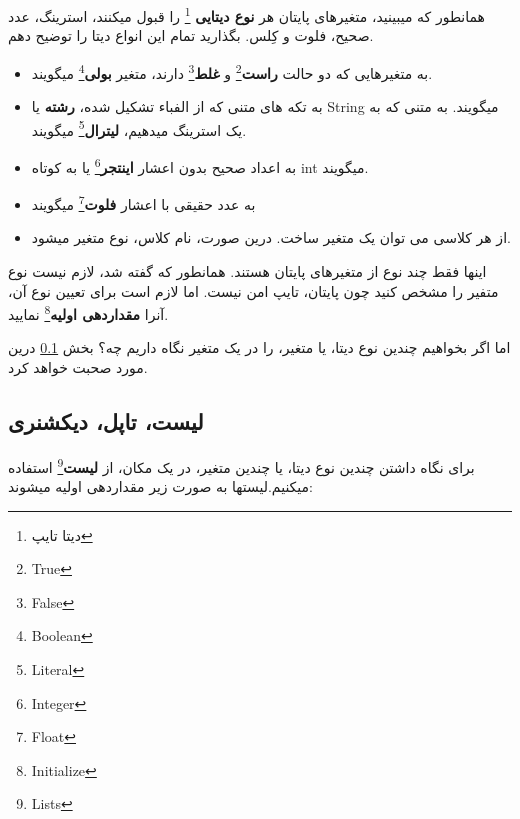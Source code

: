 \documentclass[14pt,a4paper]{memoir}
\begin{document}
	 
	 	\begin{latin}
	 		
	 	 \end{latin}
	 
	 همانطور که میبینید، متغیرهای پایتان هر \textbf{نوع دیتایی }\footnote{دیتا تایپ} را قبول میکنند، استرینگ، عدد صحیح، فلوت و کِلس. بگذارید تمام این انواع دیتا را توضیح دهم.
	 
	 \begin{itemize}
	 	\item به متغیرهایی که دو حالت \textbf{راست}\footnote{True} و \textbf{غلط}\footnote{False} دارند، متغیر \textbf{بولی}\footnote{Boolean} میگویند.
	 	\item به تکه های متنی که از الفباء تشکیل شده، \textbf{رشته} یا String میگویند. به متنی که به یک استرینگ میدهیم، \textbf{لیترال}\footnote{Literal} میگویند.
	 	\item  به اعداد صحیح بدون اعشار \textbf{اینتجر}\footnote{Integer} یا به کوتاه int میگویند.
	 	\item به عدد حقیقی با اعشار \textbf{فلوت}\footnote{Float} میگویند
	 	\item از هر کلاسی می توان یک متغیر ساخت. درین صورت، نام کلاس، نوع متغیر میشود.
	 \end{itemize}
 
 اینها فقط چند نوع از متغیرهای پایتان هستند. همانطور که گفته شد، لازم نیست نوع متفیر را مشخص کنید چون پایتان، تایپ امن نیست. اما لازم است برای تعیین نوع آن، آنرا \textbf{مقداردهی اولیه}\footnote{Initialize} نمایید.
	 
	 
	اما اگر بخواهیم چندین نوع دیتا، یا متغیر، را در یک متغیر نگاه داریم چه؟ بخش \ref{list} درین مورد صحبت خواهد کرد.
	
	\subsection{لیست، تاپل، دیکشنری}\label{list}
	 
	 برای نگاه داشتن چندین نوع دیتا، یا چندین متغیر، در یک مکان، از \textbf{لیست}\footnote{Lists} استفاده میکنیم.لیستها به صورت زیر مقداردهی اولیه میشوند:
	 
	  	\begin{latin}
	 	
	 	\end{latin}
	 		
\end{document}
